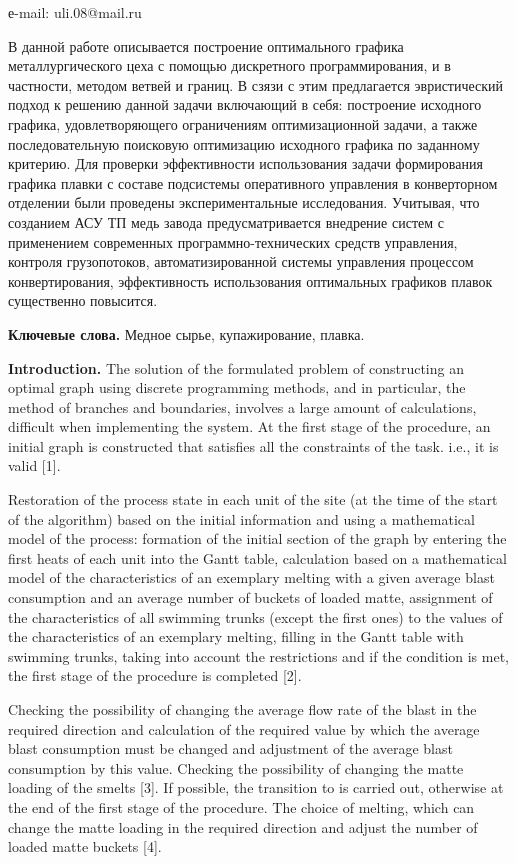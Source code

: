 е-mail: uli.08@mail.ru

В данной работе описывается построение оптимального графика
металлургического цеха с помощью дискретного программирования, и в
частности, методом ветвей и границ. В сзязи с этим предлагается
эвристический подход к решению данной задачи включающий в себя:
построение исходного графика, удовлетворяющего ограничениям
оптимизационной задачи, а также последовательную поисковую оптимизацию
исходного графика по заданному критерию. Для проверки эффективности
использования задачи формирования графика плавки с составе подсистемы
оперативного управления в конверторном отделении были проведены
экспериментальные исследования. Учитывая, что созданием АСУ ТП медь
завода предусматривается внедрение систем с применением современных
программно-технических средств управления, контроля грузопотоков,
автоматизированной системы управления процессом конвертирования,
эффективность использования оптимальных графиков плавок существенно
повысится.

{\bfseries Ключевые слова.} Медное сырье, купажирование, плавка.

{\bfseries Introduction.} The solution of the formulated problem of
constructing an optimal graph using discrete programming methods, and in
particular, the method of branches and boundaries, involves a large
amount of calculations, difficult when implementing the system. At the
first stage of the procedure, an initial graph is constructed that
satisfies all the constraints of the task. i.e., it is valid {[}1{]}.

Restoration of the process state in each unit of the site (at the time
of the start of the algorithm) based on the initial information and
using a mathematical model of the process: formation of the initial
section of the graph by entering the first heats of each unit into the
Gantt table, calculation based on a mathematical model of the
characteristics of an exemplary melting with a given average blast
consumption and an average number of buckets of loaded matte, assignment
of the characteristics of all swimming trunks (except the first ones) to
the values of the characteristics of an exemplary melting, filling in
the Gantt table with swimming trunks, taking into account the
restrictions and if the condition is met, the first stage of the
procedure is completed {[}2{]}.

Checking the possibility of changing the average flow rate of the blast
in the required direction and calculation of the required value by which
the average blast consumption must be changed and adjustment of the
average blast consumption by this value. Checking the possibility of
changing the matte loading of the smelts {[}3{]}. If possible, the
transition to is carried out, otherwise at the end of the first stage of
the procedure. The choice of melting, which can change the matte loading
in the required direction and adjust the number of loaded matte buckets
{[}4{]}.

